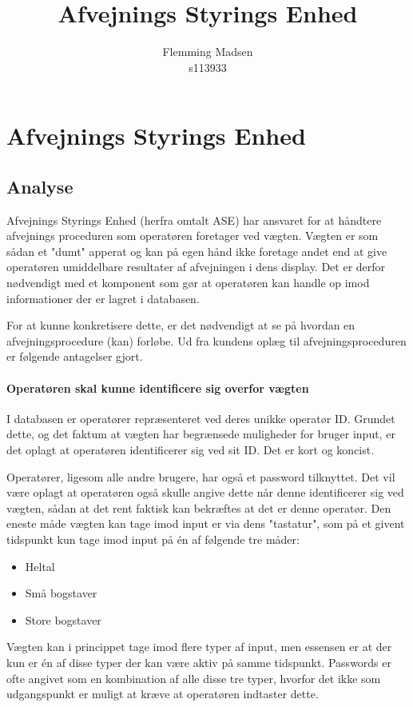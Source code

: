 \documentclass[a4paper]{article}
\title{Afvejnings Styrings Enhed}
\author{
  Flemming Madsen\\
  s113933
}
\begin{document}
\tableofcontents
\clearpage

\section{Afvejnings Styrings Enhed} %

\subsection{Analyse} %

Afvejnings Styrings Enhed (herfra omtalt ASE) har ansvaret for at håndtere afvejnings proceduren som operatøren foretager ved vægten. Vægten er som sådan et "dumt" apperat og kan på egen hånd ikke foretage andet end at give operatøren umiddelbare resultater af afvejningen i dens display. Det er derfor nødvendigt med et komponent som gør at operatøren kan handle op imod informationer der er lagret i databasen.

For at kunne konkretisere dette, er det nødvendigt at se på hvordan en afvejningsprocedure (kan) forløbe. Ud fra kundens oplæg til afvejningsproceduren er følgende antagelser gjort.

\paragraph{Operatøren skal kunne identificere sig overfor vægten} %

I databasen er operatører repræsenteret ved deres unikke operatør ID. Grundet dette, og det faktum at vægten har begrænsede muligheder for bruger input, er det oplagt at operatøren identificerer sig ved sit ID. Det er kort og koncist.

Operatører, ligesom alle andre brugere, har også et password tilknyttet. Det vil være oplagt at operatøren også skulle angive dette når denne identificerer sig ved vægten, sådan at det rent faktisk kan bekræftes at det er denne operatør. Den eneste måde vægten kan tage imod input er via dens "tastatur", som på et givent tidspunkt kun tage imod input på én af følgende tre måder:
\begin{itemize}
  \item Heltal
  \item Små bogstaver
  \item Store bogstaver
\end{itemize}
Vægten kan i princippet tage imod flere typer af input, men essensen er at der kun er én af disse typer der kan være aktiv på samme tidspunkt. Passwords er ofte angivet som en kombination af alle disse tre typer, hvorfor det ikke som udgangspunkt er muligt at kræve at operatøren indtaster dette.
\end{document}
